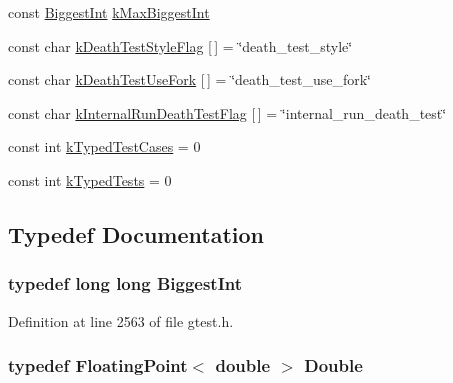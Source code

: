 \begin{DoxyCompactItemize}
const \hyperlink{namespacetesting_1_1internal_ae8f73370150f905887720532fa9f572e}{\-Biggest\-Int} \hyperlink{namespacetesting_1_1internal_af6e12b00ae1205c169d790d2ddd6724d}{k\-Max\-Biggest\-Int}
\item 
const char \hyperlink{namespacetesting_1_1internal_ac0febb92c715571e1de67b6202c9cdf0}{k\-Death\-Test\-Style\-Flag} \mbox{[}$\,$\mbox{]} = \char`\"{}death\-\_\-test\-\_\-style\char`\"{}
\item 
const char \hyperlink{namespacetesting_1_1internal_a273ce8e6e8fd1876e73ea69c279c9889}{k\-Death\-Test\-Use\-Fork} \mbox{[}$\,$\mbox{]} = \char`\"{}death\-\_\-test\-\_\-use\-\_\-fork\char`\"{}
\item 
const char \hyperlink{namespacetesting_1_1internal_a29105b980c57e381b8f5ce94122829e3}{k\-Internal\-Run\-Death\-Test\-Flag} \mbox{[}$\,$\mbox{]} = \char`\"{}internal\-\_\-run\-\_\-death\-\_\-test\char`\"{}
\item 
const int \hyperlink{namespacetesting_1_1internal_aab6cd8451834790f97a7cb7f7f6ecf28}{k\-Typed\-Test\-Cases} = 0
\item 
const int \hyperlink{namespacetesting_1_1internal_a36ce78fee501003e1b80acbb3d4ada2c}{k\-Typed\-Tests} = 0
\end{DoxyCompactItemize}


\subsection{\-Typedef \-Documentation}
\hypertarget{namespacetesting_1_1internal_ae8f73370150f905887720532fa9f572e}{
\subsubsection[{\-Biggest\-Int}]{\setlength{\rightskip}{0pt plus 5cm}typedef long long {\bf \-Biggest\-Int}}}\label{d0/da7/namespacetesting_1_1internal_ae8f73370150f905887720532fa9f572e}


\-Definition at line 2563 of file gtest.\-h.

\hypertarget{namespacetesting_1_1internal_a6c60ea293c4bfb29b9e7d03ac89202c1}{
\subsubsection[{\-Double}]{\setlength{\rightskip}{0pt plus 5cm}typedef {\bf \-Floating\-Point}$<$ double $>$ {\bf \-Double}}}\label{d0/da7/namespacetesting_1_1internal_a6c60ea293c4bfb29b9e7d03ac89202c1}


